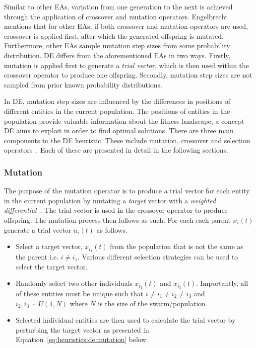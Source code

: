Similar to other \acp{EA}, variation from one generation to the next is achieved through the application of crossover and mutation operators. Engelbrecht~\cite{ref:engelbrecht:2007} mentions that for other \acp{EA}, if both crossover and mutation operators are used, crossover is applied first, after which the generated offspring is mutated. Furthermore, other \acp{EA} sample mutation step sizes from some probability distribution. \acs{DE} differs from the aforementioned \acp{EA} in two ways. Firstly, mutation is applied first to generate a \textit{trial vector}, which is then used within the crossover operator to produce one offspring. Secondly, mutation step sizes are not sampled from prior known probability distributions.

In \acs{DE}, mutation step sizes are influenced by the differences in positions of different entities in the current population. The positions of entities in the population provide valuable information about the fitness landscape, a concept \acs{DE} aims to exploit in order to find optimal solutions. There are three main components to the \acs{DE} heuristic. These include mutation, crossover and selection operators~\cite{ref:price:2006}. Each of these are presented in detail in the following sections.

\subsubsection{Mutation}\label{sec:heuristics:mh:de:mutation}

The purpose of the mutation operator is to produce a trial vector for each entity in the current population by mutating a \textit{target} vector with a \textit{weighted differential}~\cite{ref:engelbrecht:2007}. The trial vector is used in the crossover operator to produce offspring. The mutation process then follows as such. For each each parent $x_{i}(t)$ generate a trial vector $u_{i}(t)$ as follows.

\begin{itemize}
      \item Select a target vector, $x_{i_{1}}(t)$ from the population that is not the same as the parent i.e. $i \neq i_{1}$. Various different selection strategies can be used to select the target vector.

      \item Randomly select two other individuals $x_{i_{2}}(t)$ and $x_{i_{3}}(t)$. Importantly, all of these entities must be unique such that $i \neq i_{1} \neq i_{2} \neq i_{3}$ and $i_{2}, i_{3} \sim U(1, N)$ where $N$ is the size of the swarm/population.

      \item Selected individual entities are then used to calculate the trial vector by perturbing the target vector as presented in Equation~\eqref{eq:heuristics:de:mutation} below.
\end{itemize}


